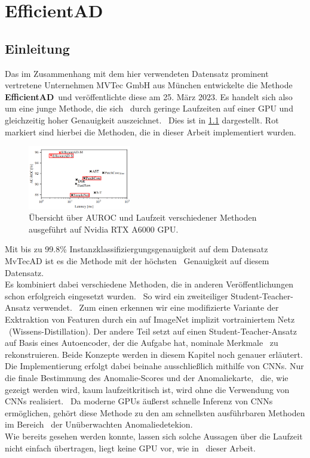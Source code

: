 
\chapter{EfficientAD} \label{ch:EfficientAD}
\section{Einleitung} \label{sec:Einleitung}
Das im Zusammenhang mit dem hier verwendeten Datensatz prominent vertretene Unternehmen MVTec GmbH aus München entwickelte die Methode \textbf{EfficientAD}\ 
und veröffentlichte diese am 25. März 2023. Es handelt sich also um eine junge Methode, die sich \
durch geringe Laufzeiten auf einer GPU und gleichzeitig hoher Genauigkeit auszeichnet. \
Dies ist in \ref{fig:efficientadoverview} dargestellt. Rot markiert sind hierbei die Methoden, die in dieser Arbeit implementiert wurden. \
\begin{figure}[h]
    \centering
    \includegraphics[width=0.4\textwidth]{bilder/overviewspeedauroc.png}
    \caption{Übersicht über AUROC und Laufzeit verschiedener Methoden ausgeführt auf Nvidia RTX A6000 GPU. \cite{efficientad}}
    \label{fig:efficientadoverview}
\end{figure}
Mit bis zu \num{99,8}\% Instanzklassifiziergungsgenauigkeit auf dem Datensatz MvTecAD ist es die Methode mit der höchsten \
Genauigkeit auf diesem Datensatz. \cite{paperswithcode} \\
Es kombiniert dabei verschiedene Methoden, die in anderen Veröffentlichungen schon erfolgreich eingesetzt wurden. \
So wird ein zweiteiliger \glqq Student-Teacher\grqq{}-Ansatz verwendet. \
Zum einen erkennen wir eine modifizierte Variante der Exktraktion von Featuren durch ein auf ImageNet implizit vortrainiertem Netz \
(Wissens-Distillation). Der andere Teil setzt auf einen Student-Teacher-Ansatz auf Basis eines Autoencoder, der die Aufgabe hat, nominale Merkmale \
zu rekonstruieren. Beide Konzepte werden in diesem Kapitel noch genauer erläutert. \\
Die Implementierung erfolgt dabei beinahe ausschließlich mithilfe von CNNs. Nur die finale Bestimmung des Anomalie-Scores und der Anomaliekarte, \
die, wie gezeigt werden wird, kaum laufzeitkritisch ist, wird ohne die Verwendung von CNNs realisiert. \
Da moderne GPUs äußerst schnelle Inferenz von CNNs ermöglichen, gehört diese Methode zu den am schnellsten ausführbaren Methoden im Bereich \
der Unüberwachten Anomaliedetekion.\cite{efficientad}\cite{paperswithcode} \\
Wie bereits gesehen werden konnte, lassen sich solche Aussagen über die Laufzeit nicht einfach übertragen, liegt keine GPU vor, wie in \
dieser Arbeit. \\
